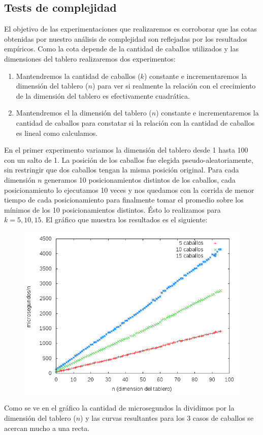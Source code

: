 \subsection{Tests de complejidad}
El objetivo de las experimentaciones que realizaremos es corroborar que las cotas obtenidas por nuestro análisis
de complejidad son reflejadas por los resultados empíricos. Como la cota depende de la cantidad de caballos
utilizados y las dimensiones del tablero realizaremos dos experimentos:
\begin{enumerate}
  \item Mantendremos la cantidad de caballos ($k$) constante e incrementaremos la dimensión del tablero ($n$) para
    ver si realmente la relación con el crecimiento de la dimensión del tablero es efectivamente cuadrática.
  \item Mantendremos el la dimensión del tablero ($n$) constante e incrementaremos la cantidad de caballos para
    constatar si la relación con la cantidad de caballos es lineal como calculamos.
\end{enumerate}

En el primer experimento variamos la dimensión del tablero desde 1 hasta 100 con un salto de 1. La posición de los
caballos fue elegida pseudo-aleatoriamente, sin restringir que dos caballos tengan la misma posición original.
Para cada dimensión $n$ generamos 10 posicionamientos distintos de los caballos, cada posicionamiento lo ejecutamos
10 veces y nos quedamos con la corrida de menor tiempo de cada posicionamiento para finalmente tomar el promedio
sobre los mínimos de los 10 posicionamientos distintos. Ésto lo realizamos para $k = 5, 10, 15$. El gráfico
que muestra los resultados es el siguiente:
\begin{figure}[H]
	\begin{minipage}[t]{\linewidth}
		\centering
		\includegraphics[width=\textwidth]{p2_varia_dimension.png}
		\label{fig:p2_complejidad_varia_dimension_tablero}
	\end{minipage}
\end{figure}
Como se ve en el gráfico la cantidad de microsegundos la dividimos por la dimensión del tablero ($n$) y las
curvas resultantes para los 3 casos de caballos se acercan mucho a una recta.

